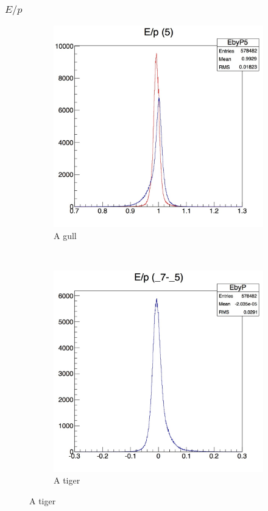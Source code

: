 \documentclass[10pt]{article}
\begin{document}
\subsubsection{$E/p$}
\begin{figure}[h!]
        \centering
        \begin{subfigure}[b]{0.4\textwidth}
                \includegraphics[width=\textwidth]{Plots/EbyPdist}
                \caption{A gull}
                \label{fig:gull}
        \end{subfigure}%
        ~ %
        \begin{subfigure}[b]{0.4\textwidth}
                \includegraphics[width=\textwidth]{Plots/EbyP}
                \caption{A tiger}
                \label{fig:tiger}
        \end{subfigure}
  

\end{figure}
\end{document}
